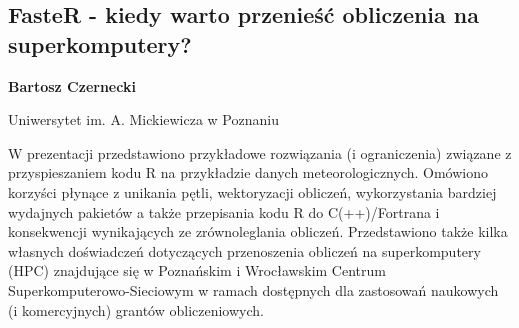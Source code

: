 \documentclass[\main/boa.tex]{subfiles}
\begin{document}
\subsection{FasteR - kiedy warto przenieść obliczenia na superkomputery?}

\begin{minipage}{0.915\textwidth}
	\centering
  {\bf {} Bartosz Czernecki}
\end{minipage}



\begin{affiliations}
\begin{minipage}{0.915\textwidth}
\centering
Uniwersytet im. A. Mickiewicza w Poznaniu  \\[-2pt]
\end{minipage}
\end{affiliations}

\vskip 0.3cm

W prezentacji przedstawiono przykładowe rozwiązania (i ograniczenia) związane z przyspieszaniem kodu R na przykładzie danych meteorologicznych. Omówiono korzyści płynące z unikania pętli, wektoryzacji obliczeń, wykorzystania bardziej wydajnych pakietów a także przepisania kodu R do C(++)/Fortrana i konsekwencji wynikających ze zrównoleglania obliczeń. 
Przedstawiono także kilka własnych doświadczeń dotyczących przenoszenia obliczeń na superkomputery (HPC) znajdujące się w Poznańskim i Wrocławskim Centrum Superkomputerowo-Sieciowym w ramach dostępnych dla zastosowań naukowych (i komercyjnych) grantów obliczeniowych.
\end{document}
